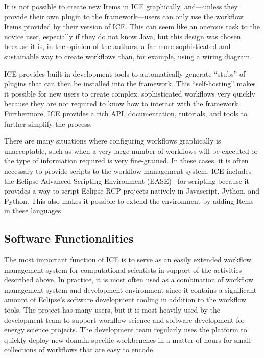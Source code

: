 It is not possible to create new Items in ICE graphically, and---unless 
they provide their own plugin to the framework---users can
only use the workflow Items provided by their version of ICE. This can seem like an
onerous task to the novice user, especially if they do not know Java, but
this design was chosen because it is, in the opinion of the authors, a
far more sophisticated and sustainable way to create workflows than, for example,
using a wiring diagram.

ICE provides built-in development tools to automatically generate ``stubs'' of
plugins that can then be installed into the framework. This
``self-hosting'' makes it possible for new users to create complex,
sophisticated workflows very quickly because they are not required to
know how to interact with the framework. Furthermore, ICE provides a
rich API, documentation, tutorials, and tools to further simplify the
process.

There are many situations where configuring workflows graphically is
unacceptable, such as when a very large number of workflows will be
executed or the type of information required is very fine-grained. In
these cases, it is often necessary to provide scripts to the workflow
management system. ICE includes the Eclipse Advanced Scripting
Environment (EASE)~\cite{pontesegger_eclipse_2015} for scripting because it
provides a way to script Eclipse RCP projects natively in Javascript,
Jython, and Python. This also makes it possible to extend the
environment by adding Items in these languages.

\subsection{Software Functionalities}\label{software-functionalities}

The most important function of ICE is to serve as an easily extended
workflow management system for computational scientists in support of
the activities described above. In practice, it is most often used as a
combination of workflow management system and development environment
since it contains a significant amount of Eclipse's software development
tooling in addition to the workflow tools. The project has many users,
but it is most heavily used by the development team to support workflow
science and software development for energy science projects. The
development team regularly uses the platform to quickly deploy new
domain-specific workbenches in a matter of hours for small collections
of workflows that are easy to encode.

